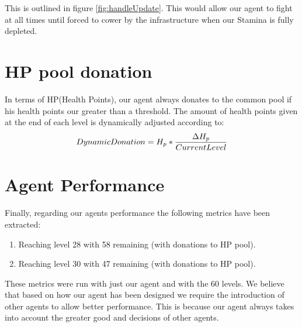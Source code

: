 This is outlined in figure \ref{fig:handleUpdate}. This would allow our agent to fight at all times until forced to cower by the infrastructure when our Stamina is fully depleted.

\section{HP pool donation}In terms of HP(Health Points), our agent always donates to the common pool if his health points our greater than a threshold. The amount of health points given at the end of each level is dynamically adjusted according to: 
\begin{equation}
\begin{aligned}[b]
Dynamic \space Donation = H_p * \frac{\Delta H_p}{CurrentLevel}
\end{aligned}
\end{equation}


\section{Agent Performance}
Finally, regarding our agents performance the following metrics have been extracted:
\begin{enumerate}
    \item Reaching level 28 with 58 remaining (with donations to HP pool).
    \item Reaching level 30 with 47 remaining (with donations to HP pool).
\end{enumerate}
These metrics were run with just our agent and with the 60 levels. We believe that based on how our agent has been designed we require the introduction of other agents to allow better performance. This is because our agent always takes into account the greater good and decisions of other agents.
